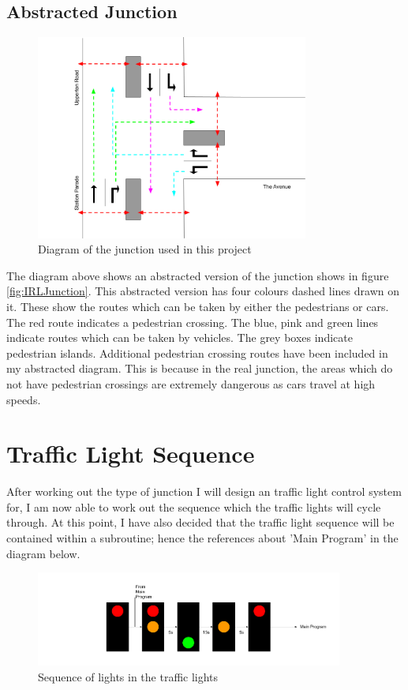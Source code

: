 \subsection{Abstracted Junction}
\begin{figure}[H]
    \centering
    \includegraphics[width=0.8\textwidth]{images/Abstracted diagram.png}
    \caption{Diagram of the junction used in this project}
    \label{fig:abstractedDiagram}
\end{figure}
\noindent The diagram above shows an abstracted version of the junction shows in figure \ref{fig:IRLJunction}. This abstracted version has four colours dashed lines drawn on it. These show the routes which can be taken by either the pedestrians or cars. The red route indicates a pedestrian crossing. The blue, pink and green lines indicate routes which can be taken by vehicles. The grey boxes indicate pedestrian islands. Additional pedestrian crossing routes have been included in my abstracted diagram. This is because in the real junction, the areas which do not have pedestrian crossings are extremely dangerous as cars travel at high speeds.

\section{Traffic Light Sequence}
After working out the type of junction I will design an traffic light control system for, I am now able to work out the sequence which the traffic lights will cycle through. At this point, I have also decided that the traffic light sequence will be contained within a subroutine; hence the references about 'Main Program' in the diagram below.
\begin{figure}[H]
    \centering
    \includegraphics[width=0.9\textwidth]{images/Traffic light sequence.png}
    \caption{Sequence of lights in the traffic lights}
    \label{fig:trafficLightSequence}
\end{figure}

